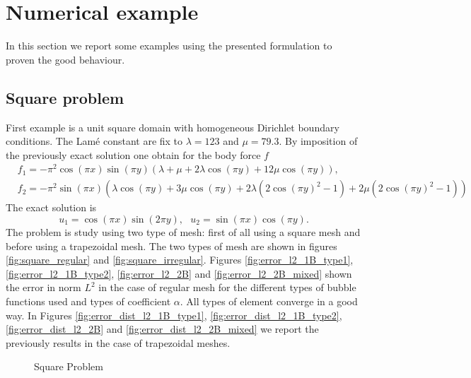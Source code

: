\documentclass[a4paper,11pt]{article}
\begin{document}
\section{Numerical example}
In this section we report some examples using the presented formulation to proven the good behaviour. 

\subsection{Square problem}
First example is a unit square domain with homogeneous Dirichlet boundary conditions.
The Lamé constant are fix to $\lambda = 123$ and $\mu=79.3$.
By imposition of the previously exact solution one obtain for the body force $f$
\begin{equation}
\begin{split}
&f_{1} = -\pi^{2} \cos(\pi x) \sin(\pi y) \left( \lambda + \mu + 2\lambda\cos(\pi y) + 
12\mu\cos(\pi y)\right), \\
&f_{2} = -\pi^{2}\sin(\pi x)\left( \lambda\cos(\pi y) + 3\mu\cos(\pi y) + 2\lambda\left(2\cos(\pi y)^{2} 
- 1\right) + 2\mu\left(2\cos(\pi y)^{2} - 1\right) \right)
\end{split}
\end{equation}
The exact solution is
\begin{equation} \label{eq:exact_solution}
u_{1} = \cos (\pi x) \sin(2\pi y), \mbox{ } u_{2} = \sin(\pi x)\cos(\pi y). 
\end{equation} 
The problem is study using two type of mesh: first of all using a square mesh and before using a trapezoidal mesh. The two types of mesh are shown in figures \ref{fig:square_regular} and \ref{fig:square_irregular}.
Figures \ref{fig:error_l2_1B_type1}, \ref{fig:error_l2_1B_type2}, \ref{fig:error_l2_2B} and \ref{fig:error_l2_2B_mixed} shown the error in norm $L^{2}$ in the case of regular mesh for the different types of bubble functions used and types of coefficient $\alpha$. All types of element converge in a good way.
In Figures  \ref{fig:error_dist_l2_1B_type1}, \ref{fig:error_dist_l2_1B_type2}, \ref{fig:error_dist_l2_2B} and \ref{fig:error_dist_l2_2B_mixed} we report the previously results in the case of trapezoidal meshes. 
%
\begin{figure}[h!]
\begin{center}
\hspace{5pt}
\caption{Square Problem}
\end{center}
\end{figure}
\end{document}

